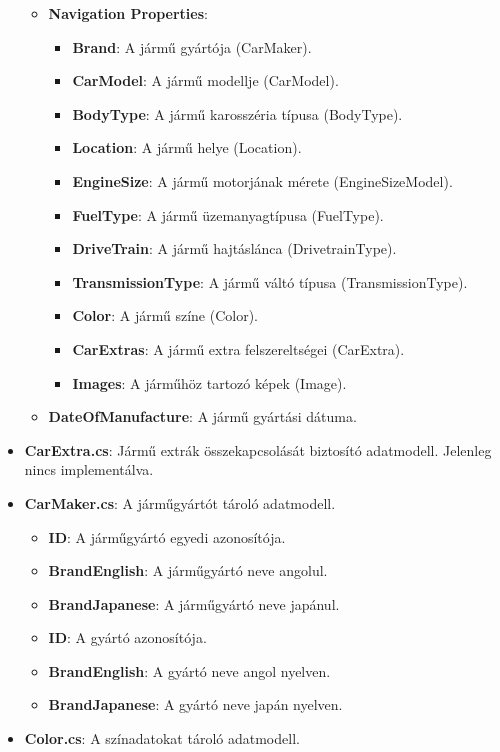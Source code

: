 \documentclass{report}[11pt]
\begin{document}
\begin{itemize}
\begin{itemize}
    \item \textbf{Navigation Properties}:
    \begin{itemize}
        \item \textbf{Brand}: A jármű gyártója (CarMaker).
        \item \textbf{CarModel}: A jármű modellje (CarModel).
        \item \textbf{BodyType}: A jármű karosszéria típusa (BodyType).
        \item \textbf{Location}: A jármű helye (Location).
        \item \textbf{EngineSize}: A jármű motorjának mérete (EngineSizeModel).
        \item \textbf{FuelType}: A jármű üzemanyagtípusa (FuelType).
        \item \textbf{DriveTrain}: A jármű hajtáslánca (DrivetrainType).
        \item \textbf{TransmissionType}: A jármű váltó típusa (TransmissionType).
        \item \textbf{Color}: A jármű színe (Color).
        \item \textbf{CarExtras}: A jármű extra felszereltségei (CarExtra).
        \item \textbf{Images}: A járműhöz tartozó képek (Image).
    \end{itemize}
    \item \textbf{DateOfManufacture}: A jármű gyártási dátuma.
\end{itemize}

    \item \textbf{CarExtra.cs}: Jármű extrák összekapcsolását biztosító adatmodell. Jelenleg nincs implementálva.\item 
    
    \textbf{CarMaker.cs}: A járműgyártót tároló adatmodell.

    \begin{itemize}
        \item \textbf{ID}: A járműgyártó egyedi azonosítója.
        \item \textbf{BrandEnglish}: A járműgyártó neve angolul.
        \item \textbf{BrandJapanese}: A járműgyártó neve japánul.
    \end{itemize}

\begin{itemize}
    \item \textbf{ID}: A gyártó azonosítója.
    \item \textbf{BrandEnglish}: A gyártó neve angol nyelven.
    \item \textbf{BrandJapanese}: A gyártó neve japán nyelven.
\end{itemize}
\item \textbf{Color.cs}: A színadatokat tároló adatmodell.


\end{itemize}
\end{document}
